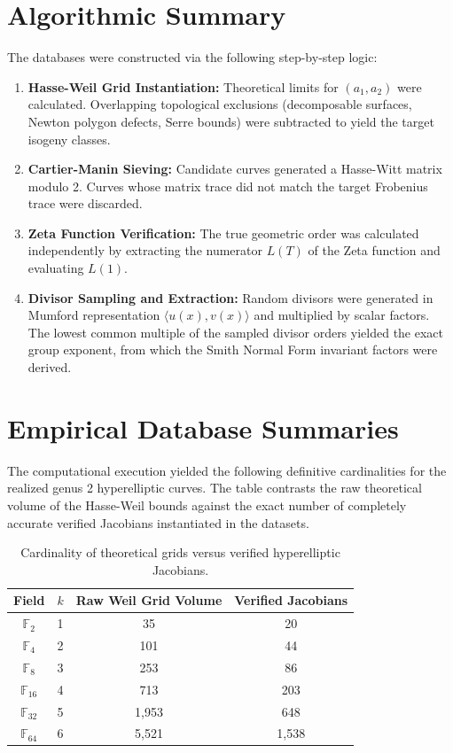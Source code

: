 \documentclass[12pt]{article}
\begin{document}
\section{Algorithmic Summary}
The databases were constructed via the following step-by-step logic:
\begin{enumerate}
    \item \textbf{Hasse-Weil Grid Instantiation:} Theoretical limits for $(a_1, a_2)$ were calculated. Overlapping topological exclusions (decomposable surfaces, Newton polygon defects, Serre bounds) were subtracted to yield the target isogeny classes.
    \item \textbf{Cartier-Manin Sieving:} Candidate curves generated a Hasse-Witt matrix modulo 2. Curves whose matrix trace did not match the target Frobenius trace were discarded.
    \item \textbf{Zeta Function Verification:} The true geometric order was calculated independently by extracting the numerator $L(T)$ of the Zeta function and evaluating $L(1)$. 
    \item \textbf{Divisor Sampling and Extraction:} Random divisors were generated in Mumford representation $\langle u(x), v(x) \rangle$ and multiplied by scalar factors. The lowest common multiple of the sampled divisor orders yielded the exact group exponent, from which the Smith Normal Form invariant factors were derived. 
\end{enumerate}

\section{Empirical Database Summaries}
The computational execution yielded the following definitive cardinalities for the realized genus 2 hyperelliptic curves. The table contrasts the raw theoretical volume of the Hasse-Weil bounds against the exact number of completely accurate verified Jacobians instantiated in the datasets.

\begin{table}[h!]
\centering
\begin{tabular}{cccc}
\toprule
Field & $k$ & Raw Weil Grid Volume & Verified Jacobians \\
\midrule
$\mathbb{F}_2$ & 1 & 35 & 20 \\
$\mathbb{F}_4$ & 2 & 101 & 44 \\
$\mathbb{F}_8$ & 3 & 253 & 86 \\
$\mathbb{F}_{16}$ & 4 & 713 & 203 \\
$\mathbb{F}_{32}$ & 5 & 1,953 & 648 \\
$\mathbb{F}_{64}$ & 6 & 5,521 & 1,538 \\
\bottomrule
\end{tabular}
\caption{Cardinality of theoretical grids versus verified hyperelliptic Jacobians.}
\end{table}
\end{document}
